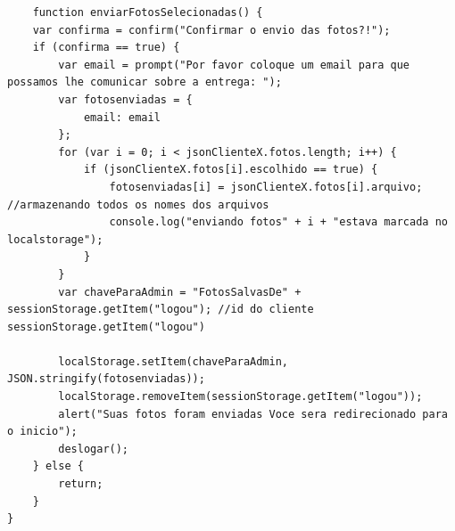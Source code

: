		\begin{lstlisting}	
	function enviarFotosSelecionadas() {
    var confirma = confirm("Confirmar o envio das fotos?!");
    if (confirma == true) {
        var email = prompt("Por favor coloque um email para que possamos lhe comunicar sobre a entrega: ");
        var fotosenviadas = { 
            email: email
        };
        for (var i = 0; i < jsonClienteX.fotos.length; i++) {
            if (jsonClienteX.fotos[i].escolhido == true) {
                fotosenviadas[i] = jsonClienteX.fotos[i].arquivo; //armazenando todos os nomes dos arquivos
                console.log("enviando fotos" + i + "estava marcada no localstorage");
            }
        }
        var chaveParaAdmin = "FotosSalvasDe" + sessionStorage.getItem("logou"); //id do cliente sessionStorage.getItem("logou")
        
        localStorage.setItem(chaveParaAdmin, JSON.stringify(fotosenviadas));
        localStorage.removeItem(sessionStorage.getItem("logou"));
        alert("Suas fotos foram enviadas Voce sera redirecionado para o inicio");
        deslogar();
    } else {
        return;
    }
}	
		\end{lstlisting}
